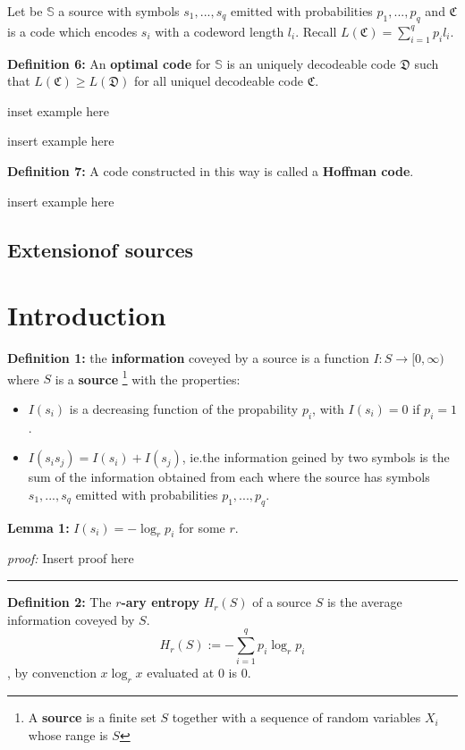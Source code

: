 \documentclass{article}
\begin{document}
\noindent Let be $\mathbb{S}$ a source with symbols $s_1, ..., s_q$ emitted with probabilities $p_1, ..., p_q$ and $\mathfrak{C}$ is a code which encodes $s_i$ with a codeword length $l_i$. Recall $L(\mathfrak{C}) = \sum_{i = 1}^{q} p_i l_i$.
		
\noindent\textbf{Definition 	6:} An \textbf{optimal code} for $\mathbb{S}$ is an uniquely decodeable code $\mathfrak{D}$ such that $L(\mathfrak{C}) \geq L(\mathfrak{D})$ for all uniquel decodeable code $\mathfrak{C}$.

inset example here

insert example here

\noindent\textbf{Definition 	7:} A code constructed in this way is called a \textbf{Hoffman code}.

insert example here

 
		\subsection{Extensionof sources}
		


		
\newpage
		\section{Introduction}

\noindent\textbf{Definition 	1:} the \textbf{information} coveyed by a source is a function $I:S  \rightarrow [ 0, \infty ) $ where $S$ is a \textbf{source} \footnote{A \textbf{source} is a finite set $S$ together with a sequence of random variables $X_i$ whose range is $S$} with the properties:
		
		\begin{itemize}
			\item $I(s_i)$ is a decreasing function of the propability $p_i$, with $I(s_i) = 0$ if $p_i = 1$.
			\item $I(s_i s_j) = I(s_i) + I(s_j)$, ie.the information geined by two symbols is the sum of the information obtained from each where the source has symbols $s_1, ..., s_q$ emitted with probabilities $p_1, ..., p_q$.
		\end{itemize}
		
\noindent\textbf{Lemma 	1: } $I(s_i) = - \log_{r}{p_i}$ for some $r$.

\noindent\textit{proof:}  Insert proof here

\noindent
{\color{gray} \rule{\linewidth}{0.5mm} }

\noindent \textbf{Definition 	2:} The \textbf{$r$-ary entropy} $H_{r}(S)$ of a source $S$ is the average information coveyed by $S$.
$$
H_{r}(S) := - \sum_{i = 1}^{q} {p_i \log_{r}{p_i}}
$$
, by convenction $x \log_{r}{x}$ evaluated at $0$ is $0$.
\end{document}
